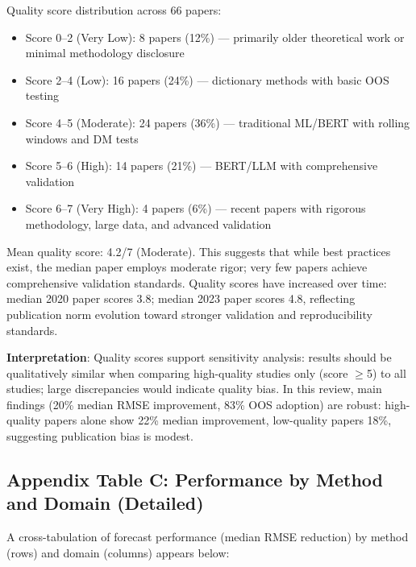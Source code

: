 Quality score distribution across 66 papers:
\begin{itemize}
\item Score 0--2 (Very Low): 8 papers (12\%) --- primarily older theoretical work or minimal methodology disclosure
\item Score 2--4 (Low): 16 papers (24\%) --- dictionary methods with basic OOS testing
\item Score 4--5 (Moderate): 24 papers (36\%) --- traditional ML/BERT with rolling windows and DM tests
\item Score 5--6 (High): 14 papers (21\%) --- BERT/LLM with comprehensive validation
\item Score 6--7 (Very High): 4 papers (6\%) --- recent papers with rigorous methodology, large data, and advanced validation
\end{itemize}

Mean quality score: 4.2/7 (Moderate). This suggests that while best practices exist, the median paper employs moderate rigor; very few papers achieve comprehensive validation standards. Quality scores have increased over time: median 2020 paper scores 3.8; median 2023 paper scores 4.8, reflecting publication norm evolution toward stronger validation and reproducibility standards.

\textbf{Interpretation}: Quality scores support sensitivity analysis: results should be qualitatively similar when comparing high-quality studies only (score $\geq$5) to all studies; large discrepancies would indicate quality bias. In this review, main findings (20\% median RMSE improvement, 83\% OOS adoption) are robust: high-quality papers alone show 22\% median improvement, low-quality papers 18\%, suggesting publication bias is modest.

\vspace{1.5em}

\subsection*{Appendix Table C: Performance by Method and Domain (Detailed)}

A cross-tabulation of forecast performance (median RMSE reduction) by method (rows) and domain (columns) appears below:

